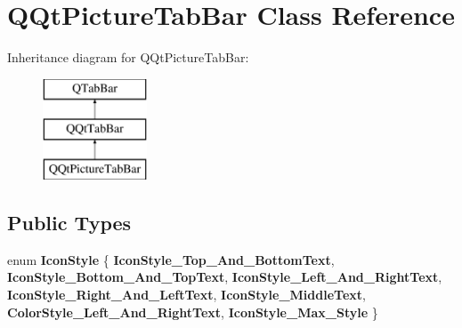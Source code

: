 \hypertarget{class_q_qt_picture_tab_bar}{}\section{Q\+Qt\+Picture\+Tab\+Bar Class Reference}
\label{class_q_qt_picture_tab_bar}
Inheritance diagram for Q\+Qt\+Picture\+Tab\+Bar\+:\begin{figure}[H]
\begin{center}
\leavevmode
\includegraphics[height=3.000000cm]{class_q_qt_picture_tab_bar}
\end{center}
\end{figure}
\subsection*{Public Types}
\begin{DoxyCompactItemize}
\item 
\mbox{\label{class_q_qt_picture_tab_bar_a0b76c94636d995100cfc0bdf32f3adc1}} 
enum {\bfseries Icon\+Style} \{ \newline
{\bfseries Icon\+Style\+\_\+\+Top\+\_\+\+And\+\_\+\+Bottom\+Text}, 
{\bfseries Icon\+Style\+\_\+\+Bottom\+\_\+\+And\+\_\+\+Top\+Text}, 
{\bfseries Icon\+Style\+\_\+\+Left\+\_\+\+And\+\_\+\+Right\+Text}, 
{\bfseries Icon\+Style\+\_\+\+Right\+\_\+\+And\+\_\+\+Left\+Text}, 
\newline
{\bfseries Icon\+Style\+\_\+\+Middle\+Text}, 
{\bfseries Color\+Style\+\_\+\+Left\+\_\+\+And\+\_\+\+Right\+Text}, 
{\bfseries Icon\+Style\+\_\+\+Max\+\_\+\+Style}
 \}
\end{DoxyCompactItemize}
